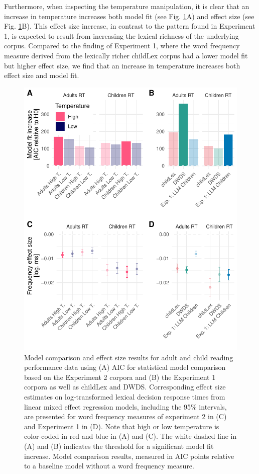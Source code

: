 \documentclass[doc, a4paper]{apa7}
\begin{document}
Furthermore, when inspecting the temperature manipulation, it is clear that an increase in temperature increases both model fit (see Fig. \ref{fig:modelcomprt2}A) and effect size (see Fig. \ref{fig:modelcomprt2}B). This effect size increase, in contrast to the pattern found in Experiment 1, is expected to result from increasing the lexical richness of the underlying corpus. Compared to the finding of Experiment 1, where the word frequency measure derived from the lexically richer childLex corpus had a lower model fit but higher effect size, we find that an increase in temperature increases both effect size and model fit. 

\begin{figure}[!htbp]
  \centerline{
    \includegraphics[width=.8\textwidth]{figures/exp12-new-col.pdf}}
    \caption{Model comparison and effect size results for adult and child reading performance data using (A) AIC for statistical model comparison based on the Experiment 2 corpora and (B) the Experiment 1 corpora as well as childLex and DWDS. Corresponding effect size estimates on log-transformed lexical decision response times from linear mixed effect regression models, including the 95\% intervals, are presented for word frequency measures of experiment 2 in (C) and Experiment 1 in (D). Note that high or low temperature is color-coded in red and blue in (A) and (C). The white dashed line in (A) and (B) indicates the threshold for a significant model fit increase. Model comparison results, measured in AIC points relative to a baseline model without a word frequency measure.}
    \label{fig:modelcomprt2}
\end{figure}
\end{document}

